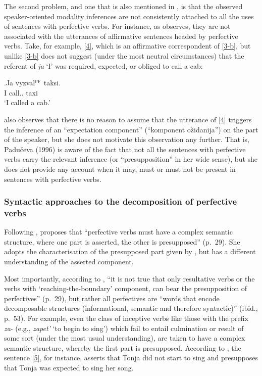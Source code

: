 The second problem, and one that is also mentioned in \citealt{Gronn:04}, is that the observed speaker-oriented modality inferences are not consistently attached to all the uses of sentences with perfective verbs. For instance, as \citet{Gronn:04} observes, they are not associated with the utterances of affirmative sentences headed by perfective verbs. Take, for example, \ref{4}, which is an affirmative correspondent of \ref{3-b}, but unlike \ref{3-b} does not suggest (under the most neutral circumstances) that the referent of \textit{ja} `I' was required, expected, or obliged to call a cab:

\exg.\label{4}Ja vyzval$^{\textsc{pf}}$ taksi.\\
 I call.. taxi\\
 \trans `I called a cab.'
 
\citet[56]{Paducheva:96} also observes that there is no reason to assume that the utterance of \ref{4} triggers the inference of an ``expectation component'' (``komponent o\v{z}idanija'') on the part of the speaker, but she does not motivate this observation any further. That is, Padu\v{c}eva (1996) is aware of the fact that not all the sentences with perfective verbs carry the relevant inference (or ``presupposition'' in her wide sense), but she does not provide any account when it may, must or must not be present in sentences with perfective verbs. 
 
\subsubsection{Syntactic approaches to the decomposition of perfective verbs}
Following \citet{Paducheva:96}, \citet{Romanova:06} proposes that ``perfective verbs must have a complex semantic structure, where one part is asserted, the other is presupposed'' (p.~29). She adopts the characterisation of the presupposed part given by \citet{Paducheva:96}, but has a different understanding of the asserted component. 

 Most importantly, according to \citet{Romanova:06}, ``it is not true that only resultative verbs or the verbs with `reaching-the-boundary' component, can bear the presupposition of perfectives'' (p.~29), but rather all perfectives are ``words that encode decomposable structures (informational, semantic and therefore syntactic)'' (ibid., p.~53). For example, even the class of inceptive verbs like those with the prefix \textit{za}-  (e.g., \textit{zapet'} `to begin to sing') which fail to entail culmination or result of some sort (under the most usual understanding), are taken to have a complex semantic structure, whereby the first part is presupposed. According to \citet{Romanova:06}, the sentence \ref{5}, for instance, asserts that Tonja did not start to sing and presupposes that Tonja was expected to sing her song.
 
